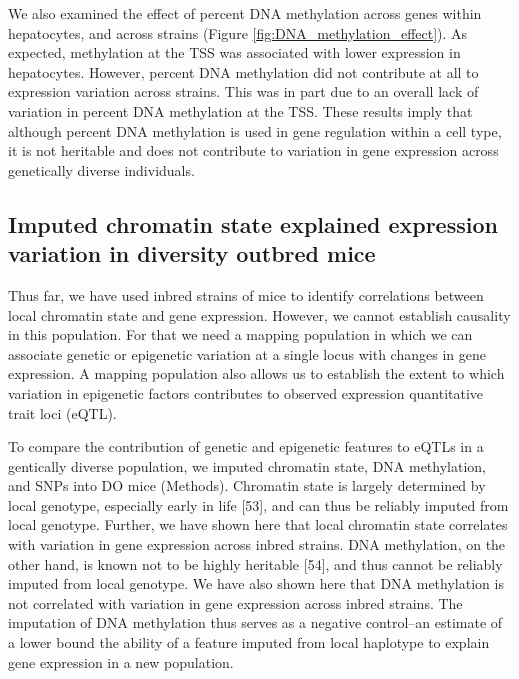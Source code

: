 \documentclass[10pt,letterpaper]{article}
\begin{document}
We also examined the effect of percent DNA methylation across genes
within hepatocytes, and across strains (Figure
\ref{fig:DNA_methylation_effect}). As expected, methylation at the TSS
was associated with lower expression in hepatocytes. However, percent
DNA methylation did not contribute at all to expression variation across
strains. This was in part due to an overall lack of variation in percent
DNA methylation at the TSS. These results imply that although percent
DNA methylation is used in gene regulation within a cell type, it is not
heritable and does not contribute to variation in gene expression across
genetically diverse individuals.

\hypertarget{imputed-chromatin-state-explained-expression-variation-in-diversity-outbred-mice}{%
\subsection{Imputed chromatin state explained expression variation in
diversity outbred
mice}\label{imputed-chromatin-state-explained-expression-variation-in-diversity-outbred-mice}}

Thus far, we have used inbred strains of mice to identify correlations
between local chromatin state and gene expression. However, we cannot
establish causality in this population. For that we need a mapping
population in which we can associate genetic or epigenetic variation at
a single locus with changes in gene expression. A mapping population
also allows us to establish the extent to which variation in epigenetic
factors contributes to observed expression quantitative trait loci
(eQTL).

To compare the contribution of genetic and epigenetic features to eQTLs
in a gentically diverse population, we imputed chromatin state, DNA
methylation, and SNPs into DO mice (Methods). Chromatin state is largely
determined by local genotype, especially early in life {[}53{]}, and can
thus be reliably imputed from local genotype. Further, we have shown
here that local chromatin state correlates with variation in gene
expression across inbred strains. DNA methylation, on the other hand, is
known not to be highly heritable {[}54{]}, and thus cannot be reliably
imputed from local genotype. We have also shown here that DNA
methylation is not correlated with variation in gene expression across
inbred strains. The imputation of DNA methylation thus serves as a
negative control--an estimate of a lower bound the ability of a feature
imputed from local haplotype to explain gene expression in a new
population.
\end{document}
